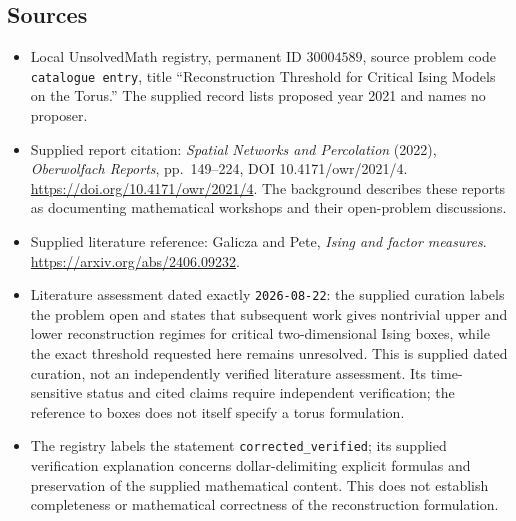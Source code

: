 \documentclass[11pt]{article}
\begin{document}
\subsection{Sources}
\begin{itemize}
\item Local UnsolvedMath registry, permanent ID \(30004589\), source problem code \texttt{catalogue entry}, title ``Reconstruction Threshold for Critical Ising Models on the Torus.'' The supplied record lists proposed year 2021 and names no proposer.
\item Supplied report citation: \emph{Spatial Networks and Percolation} (2022), \emph{Oberwolfach Reports}, pp.\ 149--224, DOI 10.4171/owr/2021/4. \url{https://doi.org/10.4171/owr/2021/4}. The background describes these reports as documenting mathematical workshops and their open-problem discussions.
\item Supplied literature reference: Galicza and Pete, \emph{Ising and factor measures}. \url{https://arxiv.org/abs/2406.09232}.
\item Literature assessment dated exactly \texttt{2026-08-22}: the supplied curation labels the problem open and states that subsequent work gives nontrivial upper and lower reconstruction regimes for critical two-dimensional Ising boxes, while the exact threshold requested here remains unresolved. This is supplied dated curation, not an independently verified literature assessment. Its time-sensitive status and cited claims require independent verification; the reference to boxes does not itself specify a torus formulation.
\item The registry labels the statement \texttt{corrected\_verified}; its supplied verification explanation concerns dollar-delimiting explicit formulas and preservation of the supplied mathematical content. This does not establish completeness or mathematical correctness of the reconstruction formulation.
\end{itemize}
\end{document}
